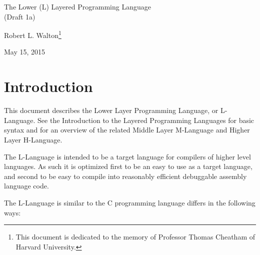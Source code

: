 \documentclass[12pt]{article}
\makeatletter
\renewcommand\tableofcontents{%
    \begin{list}{}%
	     {\setlength{\itemsep}{0in}%
	      \setlength{\topsep}{0in}%
	      \setlength{\parsep}{1ex}%
	      \setlength{\labelwidth}{0in}%
	      \setlength{\baselineskip}{1.5ex}%
	      \setlength{\leftmargin}{1.0in}%
	      \setlength{\rightmargin}{1.0in}}%
    \item\@starttoc{toc}%
    \end{list}}
\makeatother
\begin{document}
        
\begin{center}

{\Large
The Lower (L) Layered Programming Language \\[0.5ex]
(Draft 1a)}

\medskip

Robert L. Walton\footnote{This document is dedicated to the memory
of Professor Thomas Cheatham of Harvard University.}

May 15, 2015
 
\end{center}

{\small \tableofcontents}

\newpage

\section{Introduction}

This document describes the Lower Layer Programming Language, or
L-Language.  See the Introduction to the Layered
Programming Languages for basic syntax and for an overview of the related
Middle Layer M-Language and Higher Layer H-Language.

The L-Language is intended to be a target language for compilers of
higher level languages.  As such it is optimized first to be an easy to 
use as a target language, and second to be easy to
compile into reasonably efficient debuggable assembly language code.

The L-Language is similar to the C programming language
differs in the following ways:
\end{document}
